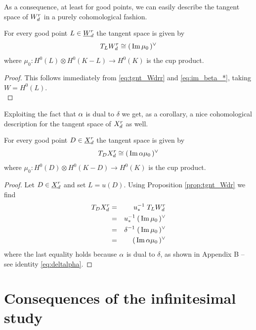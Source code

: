 	As a consequence, at least for good points, we can easily describe the tangent space of $W_d^r$ in a purely cohomological fashion.
	\begin{prop}\label{prop:tgnt_Wdr}
		For every good point $L\in \underline{W}_d^{r}$ the tangent space is given by
		$$ T_LW_d^r \cong (\,\operatorname{Im} \mu_{0}\,)^{\vee} $$
		where $ \mu_{0} : H^0(L)\otimes H^0(K-L) \to H^0(K) $ is the cup product.
	\end{prop}
	\begin{proof}
		This follows immediately from \eqref{eq:tgnt_Wdrr} and \eqref{eq:im_beta_*}, taking $W=H^0(L)$.\\
	\end{proof}
	Exploiting the fact that $\alpha$ is dual to $\delta$ we get, as a corollary, a nice cohomological description for the tangent space of $X_d^r$ as well.
	\begin{coro}\label{coro:tgnt_Xdr}
		For every good point $D\in \underline{X}_d^{r}$ the tangent space is given by
		$$ T_DX_d^r \cong (\,\operatorname{Im} \alpha \mu_{0}\,)^{\vee} $$
		where $ \mu_{0} : H^0(D)\otimes H^0(K-D) \to H^0(K) $ is the cup product.
	\end{coro}
	\begin{proof}
		Let $D \in \underline{X}_d^{r}$ and set $L=u(D)$. Using Proposition \ref{prop:tgnt_Wdr} we find
		\begin{eqnarray*}
			T_D X_d^r 
			&=& u_{*}^{-1}\; T_L W_d^r \\
			&=& u_{*}^{-1}\: (\,\operatorname{Im} \mu_0\,)^{\vee} \\
			&=& \delta^{-1}\; (\,\operatorname{Im} \mu_0\,)^{\vee} \\
			&=& (\,\operatorname{Im} \alpha \mu_0\,)^{\vee}
		\end{eqnarray*}
		where the last equality holds because $\alpha$ is dual to $\delta$, as shown in Appendix B -- see identity \eqref{eq:deltalpha}.
	\end{proof}


\section{Consequences of the infinitesimal study}

